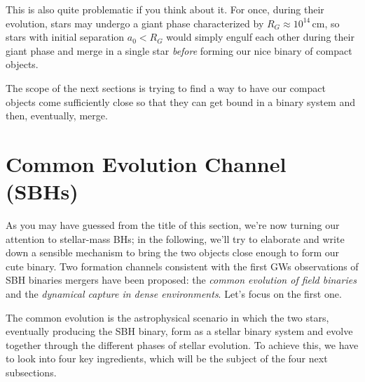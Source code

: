 \par This is also quite problematic if you think about it. For once, during their evolution, stars may undergo a giant phase characterized by $R_{G} \approx 10^{14}\,\text{cm}$, so stars with initial separation $a_{0}<R_{G}$ would simply engulf each other during their giant phase and merge in a single star \emph{before} forming our nice binary of compact objects.
\par The scope of the next sections is trying to find a way to have our compact objects come sufficiently close so that they can get bound in a binary system and then, eventually, merge.
\section{Common Evolution Channel (SBHs)}
As you may have guessed from the title of this section, we're now turning our attention to stellar-mass BHs; in the following, we'll try to elaborate and write down a sensible mechanism to bring the two objects close enough to form our cute binary. Two formation channels consistent with
the ﬁrst GWs observations of SBH binaries mergers have been proposed: the \emph{common evolution of ﬁeld binaries} and the \emph{dynamical capture in dense
environments}. Let's focus on the first one.
\par The common evolution is the astrophysical scenario in which the two stars, eventually producing the SBH binary, form as a stellar binary system and evolve together through the diﬀerent phases of stellar evolution. To achieve this, we have to look into four key ingredients, which will be the subject of the four next subsections.
